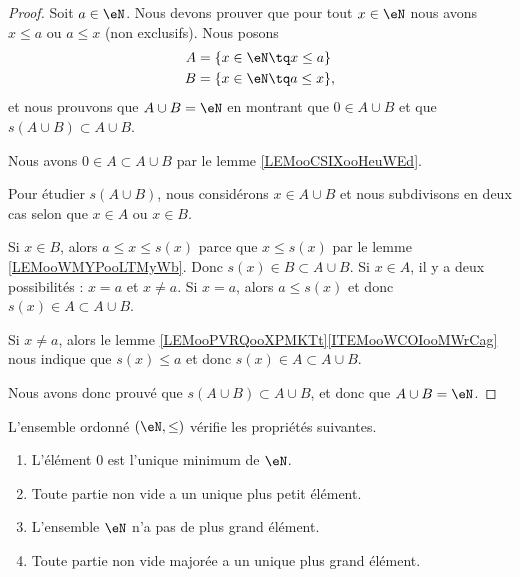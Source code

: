\begin{proof}
	Soit \( a\in \eN\). Nous devons prouver que pour tout \( x\in \eN\) nous avons \( x\leq a\) ou \( a\leq x\) (non exclusifs). Nous posons
	\begin{subequations}
		\begin{align}
			A & =\{ x\in \eN\tq x\leq a \}  \\
			B & =\{ x\in \eN\tq a\leq x \},
		\end{align}
	\end{subequations}
	et nous prouvons que \( A\cup B=\eN\) en montrant que \( 0\in A\cup B\) et que \( s(A\cup B)\subset A\cup B\).

	Nous avons \( 0\in A\subset A\cup B\) par le lemme \ref{LEMooCSIXooHeuWEd}.

	Pour étudier \( s(A\cup B)\), nous considérons \( x\in A\cup B\) et nous subdivisons en deux cas selon que \( x\in A\) ou \( x\in B\).

	\begin{subproof}
		\spitem[Si \( x\in B\)]
		Si \( x\in B\), alors \( a\leq x\leq s(x)\) parce que \( x\leq s(x)\) par le lemme \ref{LEMooWMYPooLTMyWb}. Donc \( s(x)\in B\subset A\cup B\).
		\spitem[Si \( x\in A\)]
		Si \( x\in A\), il y a deux possibilités : \( x=a\) et \( x\neq a\). Si \( x=a\), alors \( a\leq s(x)\) et donc \( s(x)\in A\subset A\cup B\).

		Si \( x\neq a\), alors le lemme \ref{LEMooPVRQooXPMKTt}\ref{ITEMooWCOIooMWrCag} nous indique que \( s(x)\leq a\) et donc \( s(x)\in A\subset A\cup B\).
	\end{subproof}
	Nous avons donc prouvé que \( s(A\cup B)\subset A\cup B\), et donc que \( A\cup B=\eN\).
\end{proof}

\begin{proposition}     \label{PROPooMZOWooHmsXzI}
	L'ensemble ordonné \( (\eN,\leq)\) vérifie les propriétés suivantes.
	\begin{enumerate}
		\item       \label{ITEMooJLAHooDKukfH}
		      L'élément \( 0\) est l'unique minimum de \( \eN\).
		\item       \label{ITEMooYAJIooEFmOpB}
		      Toute partie non vide a un unique plus petit élément.
		\item       \label{ITEMooSRGOooNYJJHY}
		      L'ensemble \( \eN\) n'a pas de plus grand élément.
		\item       \label{ITEMooKIHZooDRTCdx}
		      Toute partie non vide majorée a un unique plus grand élément.
	\end{enumerate}
\end{proposition}

